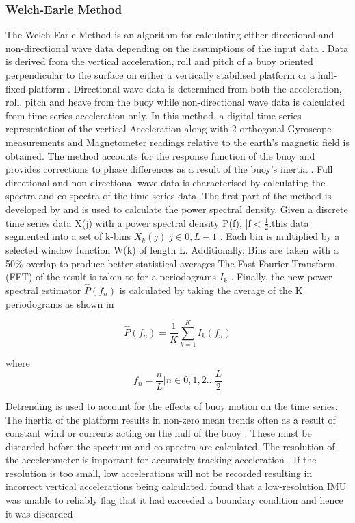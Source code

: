 \subsubsection{Welch-Earle Method}

The Welch-Earle Method is an algorithm for calculating either directional and non-directional wave data depending on the assumptions of the input data \cite{earle1996nondirectional}. Data is derived from the vertical acceleration, roll and pitch of a buoy oriented perpendicular to the surface on either a vertically stabilised platform or a hull-fixed platform \cite{earle1996nondirectional}. Directional wave data is determined from both the acceleration, roll, pitch and heave from the buoy while non-directional wave data is calculated from time-series acceleration only. In this method, a digital time series representation of the vertical Acceleration along with 2 orthogonal Gyroscope measurements and Magnetometer readings relative to the earth’s magnetic field is obtained. The method accounts for the response function of the buoy and provides corrections to phase differences as a result of the buoy's inertia \cite{earle1996nondirectional}. Full directional and non-directional wave data is characterised by calculating the spectra and co-spectra of the time series data. The first part of the method is developed by \textcite{welch1967use} and is used to calculate the power spectral density.
Given a discrete time series data X(j) with a power spectral density P(f), |f|< $\frac{1}{2}$.this data segmented into a set of k-bins $X_k(j) | j \in {0,L-1}$ \cite{welch1967use}. Each bin is multiplied by a selected window function W(k) of length L. Additionally, Bins are taken with a 50\% overlap to produce better statistical averages \cite{earle1996nondirectional} The Fast Fourier Transform (FFT) of the result is taken to for a periodograms $I_k$ \cite{earle1996nondirectional}. Finally, the new power spectral estimator $\hat{P}(f_n)$ is calculated by taking the average of the K periodograms as shown in \textcite{welch1967use}

\begin{equation}
    \hat{P}(f_n) = \frac{1}{K}\sum^K_{k=1}I_k(f_n)
\end{equation}

where 
\begin{equation}
    f_n = \frac{n}{L} | n \in 0,1,2... \frac{L}{2}
\end{equation}

Detrending is used to account for the effects of buoy motion on the time series. The inertia of the platform results in non-zero mean trends often as a result of constant wind or currents acting on the hull of the buoy \cite{earle1996nondirectional}. These must be discarded before the spectrum and co spectra are calculated. The resolution of the accelerometer is important for accurately tracking acceleration \cite{kohout2015device}. If the resolution is too small, low accelerations will not be recorded resulting in incorrect vertical accelerations being calculated. \textcite{kohout2015device} found that a low-resolution IMU was unable to reliably flag that it had exceeded a boundary condition and hence it was discarded \cite{kohout2015device}\par 

